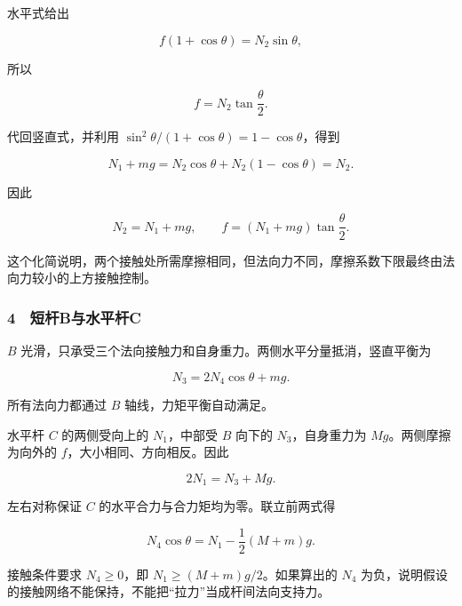 \documentclass[12pt,a4paper,fontset=fandol]{ctexart}
\begin{document}
水平式给出

\[f(1+\cos\theta)=N_2\sin\theta,\]

所以

\[\boxed{f=N_2\tan\frac\theta2.}\]

代回竖直式，并利用 \(\sin^2\theta/(1+\cos\theta)=1-\cos\theta\)，得到

\[N_1+mg=N_2\cos\theta+N_2(1-\cos\theta)=N_2.\]

因此

\[\boxed{N_2=N_1+mg,\qquad
f=(N_1+mg)\tan\frac\theta2.}\]

这个化简说明，两个接触处所需摩擦相同，但法向力不同，摩擦系数下限最终由法向力较小的上方接触控制。

\subsubsection{4　短杆B与水平杆C}\label{ux77edux6746bux4e0eux6c34ux5e73ux6746c}

\(B\) 光滑，只承受三个法向接触力和自身重力。两侧水平分量抵消，竖直平衡为

\[\boxed{N_3=2N_4\cos\theta+mg.}\]

所有法向力都通过 \(B\) 轴线，力矩平衡自动满足。

水平杆 \(C\) 的两侧受向上的 \(N_1\)，中部受 \(B\) 向下的
\(N_3\)，自身重力为 \(Mg\)。两侧摩擦为向外的
\(f\)，大小相同、方向相反。因此

\[\boxed{2N_1=N_3+Mg.}\]

左右对称保证 \(C\) 的水平合力与合力矩均为零。联立前两式得

\[\boxed{N_4\cos\theta=N_1-\frac12(M+m)g.}\]

接触条件要求 \(N_4\ge0\)，即 \(N_1\ge(M+m)g/2\)。如果算出的 \(N_4\)
为负，说明假设的接触网络不能保持，不能把``拉力''当成杆间法向支持力。
\end{document}
